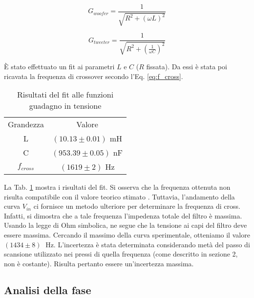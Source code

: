 \documentclass[../Relazione_circuiti]{subfiles}
\begin{document}
  \begin{equation}
    \label{eq:gain_woofer}
    G_{woofer} = \frac{1}{\sqrt{R^2+(\omega L)^2}}
  \end{equation}

  \begin{equation}
    \label{eq:gain_tweeter}
    G_{tweeter} = \frac{1}{\sqrt{R^2+(\frac{1}{\omega C})^2}}
  \end{equation}



  È stato effettuato un fit ai parametri $L$ e $C$ ($R$ fissata).
  Da essi è stata poi ricavata la frequenza di crossover secondo l'Eq. \eqref{eq:f_cross}.

  \begin{table}[H]
    \centering

    \begin{tabular}{c | c }

      Grandezza & Valore                 \\

      L         & $(10.13 \pm 0.01)$ mH  \\
      C         & $(953.39 \pm 0.05)$ nF \\
      $f_{cross}$ & $(1619 \pm 2)$ Hz

    \end{tabular}

    \caption{Risultati del fit alle funzioni guadagno in tensione}
    \label{tab:fit_amplitude}

  \end{table}

  La Tab. \ref{tab:fit_amplitude} mostra i risultati del fit.
  Si osserva che la frequenza ottenuta non risulta compatibile con il valore teorico stimato \theoryF.
  Tuttavia, l'andamento della curva $V_{in}$ ci fornisce un metodo ulteriore per determinare la frequenza di cross.
  Infatti, si dimostra che a tale frequenza l'impedenza totale del filtro è massima.
  Usando la legge di Ohm simbolica, ne segue che la tensione ai capi del filtro deve essere massima.
  Cercando il massimo della curva sperimentale, otteniamo il valore $(1434 \pm 8) \;$ Hz.
  L'incertezza è stata determinata considerando metà del passo di scansione utilizzato nei pressi di quella frequenza
  (come descritto in sezione 2, non è costante). Risulta pertanto essere un'incertezza massima.
  


\subsection{Analisi della fase}
\end{document}
